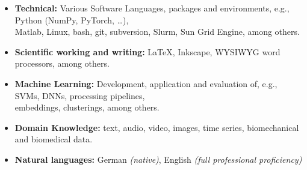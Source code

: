 
\begin{itemize}
    \item [] \textbf{Technical:}
    Various Software Languages, packages and environments, e.g.,
    Python (NumPy, PyTorch, \dots),\\
    \vphantom{}\qquad Matlab, Linux, bash, git, subversion, Slurm, Sun Grid Engine, among others.

    \item[] \textbf{Scientific working and writing:}
    LaTeX, Inkscape, WYSIWYG word processors, among others.

    \item[] \textbf{Machine Learning:} Development, application and evaluation of, e.g., 
    SVMs, DNNs, processing pipelines,\\
    \vphantom{}\qquad embeddings, clusterings, among others.

    \item[] \textbf{Domain Knowledge:}
    text, audio, video, images, time series, biomechanical and biomedical data.

    \item[] \textbf{Natural languages:}
    German \textit{(native)}, English \textit{(full professional proficiency)}
\end{itemize}

